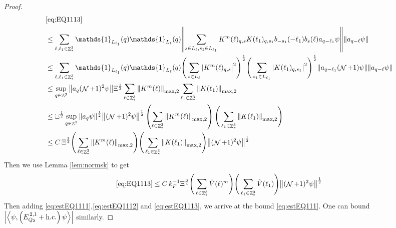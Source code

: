 \documentclass[sn-mathphys, Numbered ,a4paper]{sn-jnl}%
\DeclareMathOperator{\Z}{\mathbb{Z}}
\DeclareMathOperator{\NN}{\mathcal{N}}
\newcommand{\half}{\frac{1}{2}}
\newcommand{\eva}[1]{\left\langle #1 \right\rangle}
\theoremstyle{plain}
\theoremstyle{definition}
\theoremstyle{remark}
\theoremstyle{plain}
\theoremstyle{definition}
\theoremstyle{remark}
\begin{document}
\begin{proof}
\begin{comment}
		&\leq  C \,\Xi^\half \left(\sum\limits_{\ell \in \Z^3_*} \norm{K^m(\ell)}_{\mathrm{max,2}}\right)\Bigg(\sum\limits_{\ell_1 \in \Z^3_*} \norm{K(\ell_1)}_{\mathrm{max,2}}^2 \Bigg)^\half \sup_{q \in \Z^3}\norm{ a_{q} \psi}^\half \norm{ \NN^{\frac{3}{2}}\psi}^\half \nonumber\\
		&\leq  C \,\Xi^{\frac{3}{4}} \left(\sum\limits_{\ell \in \Z^3_*} \norm{K^m(\ell)}_{\mathrm{max,2}}\right)\Bigg(\sum\limits_{\ell_1 \in \Z^3_*} \norm{K(\ell_1)}_{\mathrm{max,2}}^2 \Bigg)^\half  \norm{ \NN^{\frac{3}{2}}\psi}^\half \label{eq:estEQ1113}
	\end{align}
\end{comment}
\begin{align}
	&\eqref{eq:EQ1113}\nonumber\\
	&\leq\sum\limits_{\ell, \ell_1\in \Z^3_*} \mathds{1}_{L_{\ell_1}}(q) \mathds{1}_{L_{\ell}}(q)  \norm{ \sum\limits_{s\in L_{\ell}, s_1 \in L_{\ell_1}} K^m(\ell)_{q,s}K(\ell_1)_{q,s_1} b_{-s_1}(-\ell_1) b_{s}(\ell) a_{q-\ell_1}\psi}\norm{ a_{q-\ell}\psi }\nonumber\\
	&\leq\sum\limits_{\ell, \ell_1\in \Z^3_*} \mathds{1}_{L_{\ell_1}}(q) \mathds{1}_{L_{\ell}}(q) \Bigg(\sum\limits_{s \in L_{\ell}} \abs{K^m(\ell)_{q,s}}^2\Bigg)^\half \Bigg(\sum\limits_{s_1 \in L_{\ell_1}} \abs{K(\ell_1)_{q,s_1}}^2\Bigg)^\half \norm{ a_{q-\ell_1} (\NN+1)\psi} \norm{ a_{q-\ell}\psi }\nonumber\\
	&\leq \sup_{q \in \Z^3}\norm{ a_{q} (\NN+1)^2\psi}\Xi^\half\sum\limits_{\ell \in \Z^3_*} \norm{  K^{m}(\ell)}_{\mathrm{max,2}}  \sum\limits_{\ell_1 \in \Z^3_*} \norm{K(\ell_1)}_{\mathrm{max,2}} \nonumber\\
	&\leq  \Xi^\half  \sup_{q \in \Z^3}\norm{ a_{q} \psi}^\half \norm{ (\NN+1)^2\psi}^\half \left(\sum\limits_{\ell \in \Z^3_*} \norm{K^m(\ell)}_{\mathrm{max,2}}\right)\Bigg(\sum\limits_{\ell_1 \in \Z^3_*} \norm{K(\ell_1)}_{\mathrm{max,2}}\Bigg) \nonumber\\
	&\leq C\,\Xi^{\frac{3}{4}} \Bigg(\sum\limits_{\ell \in \Z^3_*} \norm{K^m(\ell)}_{\mathrm{max,2}}\Bigg)\Bigg(\sum\limits_{\ell_1 \in \Z^3_*} \norm{K(\ell_1)}_{\mathrm{max,2}} \Bigg)  \norm{ (\NN+1)^2\psi}^\half \nonumber
\end{align}
Then we use Lemma \ref{lem:normsk} to get
\begin{equation}
	\eqref{eq:EQ1113}\leq C\, k_{F}^{-1}\Xi^{\frac{3}{4}} \Bigg(\sum\limits_{\ell \in \Z^3_*} \hat{V}(\ell)^m\Bigg) \Bigg(\sum\limits_{\ell_1 \in \Z^3_*} \hat{V}(\ell_1) \Bigg)  \norm{ (\NN+1)^2\psi}^\half \label{eq:estEQ1113}
\end{equation}
Then adding \eqref{eq:estEQ1111},\eqref{eq:estEQ1112} and \eqref{eq:estEQ1113}, we arrive at the bound \eqref{eq:estEQ111}.  One can bound $\abs{\eva{\psi,\left(E^{\,2,1}_{Q_2}+\mathrm{h.c.}\right) \psi }}$ similarly.
\end{proof}
\end{document}
